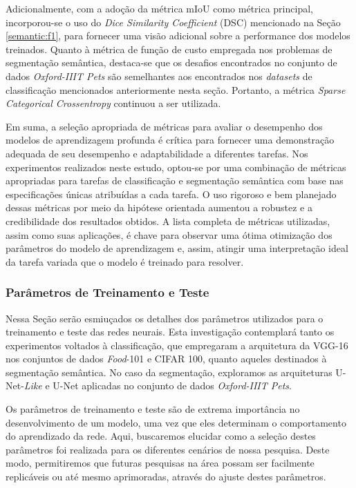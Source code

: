 Adicionalmente, com a adoção da métrica mIoU como métrica principal, incorporou-se o uso do \textit{Dice Similarity Coefficient} (DSC) mencionado na Seção \ref{semantic:f1}, para fornecer uma visão adicional sobre a performance dos modelos treinados. Quanto à métrica de função de custo empregada nos problemas de segmentação semântica, destaca-se que os desafios encontrados no conjunto de dados \textit{Oxford-IIIT Pets} são semelhantes aos encontrados nos \textit{datasets} de classificação mencionados anteriormente nesta seção. Portanto, a métrica \textit{Sparse Categorical Crossentropy} continuou a ser utilizada.

Em suma, a seleção apropriada de métricas para avaliar o desempenho dos modelos de aprendizagem profunda é crítica para fornecer uma demonstração adequada de seu desempenho e adaptabilidade a diferentes tarefas. Nos experimentos realizados neste estudo, optou-se por uma combinação de métricas apropriadas para tarefas de classificação e segmentação semântica com base nas especificações únicas atribuídas a cada tarefa. O uso rigoroso e bem planejado dessas métricas por meio da hipótese orientada aumentou a robustez e a credibilidade dos resultados obtidos. A lista completa de métricas utilizadas, assim como suas aplicações, é chave para observar uma ótima otimização dos parâmetros do modelo de aprendizagem e, assim, atingir uma interpretação ideal da tarefa variada que o modelo é treinado para resolver.


\subsubsection{Parâmetros de Treinamento e Teste}
\label{project:params}
Nessa Seção serão esmiuçados os detalhes dos parâmetros utilizados para o treinamento e teste das redes neurais. Esta investigação contemplará tanto os experimentos voltados à classificação, que empregaram a arquitetura da VGG-16 nos conjuntos de dados \textit{Food}-101 e CIFAR 100, quanto aqueles destinados à segmentação semântica. No caso da segmentação, exploramos as arquiteturas U-Net-\textit{Like} e U-Net aplicadas no conjunto de dados \textit{Oxford-IIIT Pets}.

Os parâmetros de treinamento e teste são de extrema importância no desenvolvimento de um modelo, uma vez que eles determinam o comportamento do aprendizado da rede. Aqui, buscaremos elucidar como a seleção destes parâmetros foi realizada para os diferentes cenários de nossa pesquisa. Deste modo, permitiremos que futuras pesquisas na área possam ser facilmente replicáveis ou até mesmo aprimoradas, através do ajuste destes parâmetros.

